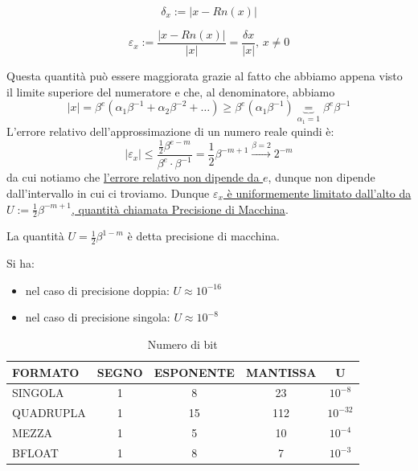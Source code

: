 \documentclass[12pt,a4paper,]{report}
\renewcommand{\arraystretch}{1.7}
\begin{document}
\begin{definizione}
    \[
    \delta_x := |x - Rn(x)|
    \]
\end{definizione}
\begin{definizione}
    \[
    \varepsilon_x := \frac{|x - Rn(x)|}{|x|} = \frac{\delta x}{|x|}, \,x \neq 0
    \]  
\end{definizione}
\noindent
Questa quantità può essere maggiorata grazie al fatto che abbiamo appena visto il limite superiore del numeratore e che, al denominatore, abbiamo 
\[
    |x| = \beta^e (\alpha_1\beta^{-1}+\alpha_2\beta^{-2}+\dots) \ge \beta^e (\alpha_1\beta^{-1}) \underbrace{=}_{\alpha_1 = 1}\beta^e \beta^{-1}
\]
L'errore relativo dell'approssimazione di un numero reale quindi è:
\[
\boxed{|\varepsilon_x| \leq \frac{\frac{1}{2}\beta^{e-m}}{\beta^e \cdot \beta^{-1}} = \frac{1}{2}\beta^{-m+1}} \xrightarrow{\beta=2} 2^{-m}
\]
da cui notiamo che \uline{l'errore relativo non dipende da $e$}, dunque non dipende dall'intervallo in cui ci troviamo. Dunque \uline{$\varepsilon_x$ è uniformemente limitato dall'alto da $U := \frac{1}{2}\beta^{-m+1}$, quantità chiamata Precisione di Macchina}.

\begin{definizione}
    \label{def: prec di macchina}
    La quantità $U= \frac{1}{2}\beta^{1-m}$ è detta precisione di macchina.
\end{definizione}
\noindent
Si ha:
\begin{itemize}
    \item nel caso di precisione doppia: $U \approx 10^{-16}$
    \item nel caso di precisione singola: $U \approx 10^{-8}$
\end{itemize}

\begin{table}[H]
\centering
\renewcommand{\arraystretch}{1.5} %
\begin{tabular}{|l|c|c|c|c|}
\hline
\textbf{FORMATO} & \textbf{SEGNO} & \textbf{ESPONENTE} & \textbf{MANTISSA} & \textbf{U} \\ \hline
SINGOLA          & 1              & 8                  & 23                & $10^{-8}$  \\ \hline
QUADRUPLA        & 1              & 15                 & 112               & $10^{-32}$ \\ \hline
MEZZA            & 1              & 5                  & 10                & $10^{-4}$  \\ \hline
BFLOAT           & 1              & 8                  & 7                 & $10^{-3}$  \\ \hline
\end{tabular}
\caption{Numero di bit}
\end{table}
\end{document}
